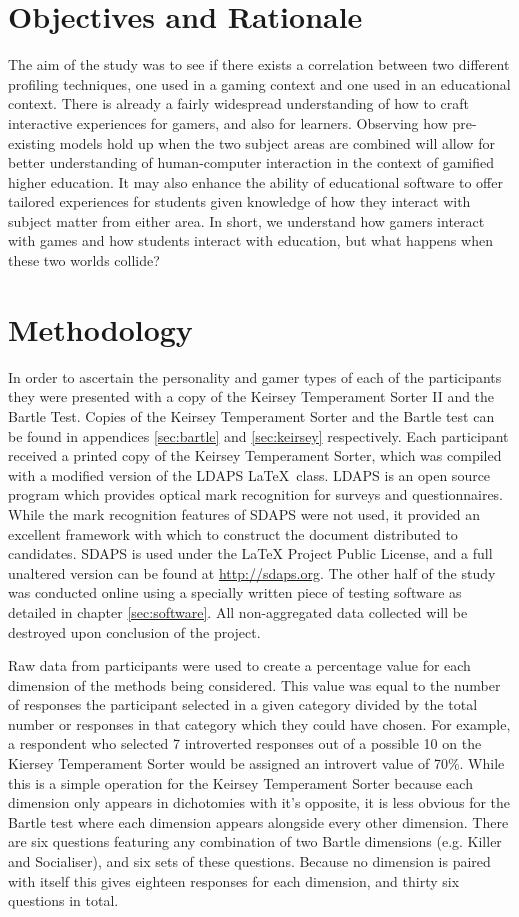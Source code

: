 \documentclass[12pt,a4paper,twoside]{report}
\begin{document}
\section{Objectives and Rationale}
The aim of the study was to see if there exists a correlation between two different profiling techniques, one used in a gaming context and one used in an educational context. There is already a fairly widespread understanding of how to craft interactive experiences for gamers, and also for learners. Observing how pre-existing models hold up when the two subject areas are combined will allow for better understanding of human-computer interaction in the context of gamified higher education. It may also enhance the ability of educational software to offer tailored experiences for students given knowledge of how they interact with subject matter from either area. In short, we understand how gamers interact with games and how students interact with education, but what happens when these two worlds collide?

\section{Methodology}
\label{method}
In order to ascertain the personality and gamer types of each of the participants they were presented with a copy of the Keirsey Temperament Sorter II and the Bartle Test. Copies of the Keirsey Temperament Sorter and the Bartle test can be found in appendices \ref{sec:bartle} and \ref{sec:keirsey} respectively. Each participant received a printed copy of the Keirsey Temperament Sorter, which was compiled with a modified version of the LDAPS  \LaTeX \ class. LDAPS is an open source program which provides optical mark recognition for surveys and questionnaires. While the mark recognition features of SDAPS were not used, it provided an excellent framework with which to construct the document distributed to candidates. SDAPS is used under the LaTeX Project Public License, and a full unaltered version can be found at \url{http://sdaps.org}. The other half of the study was conducted online using a specially written piece of testing software as detailed in chapter \ref{sec:software}. All non-aggregated data collected will be destroyed upon conclusion of the project.

Raw data from participants were used to create a percentage value for each dimension of the methods being considered. This value was equal to the number of responses the participant selected in a given category divided by the total number or responses in that category which they could have chosen. For example, a respondent who selected 7 introverted responses out of a possible 10 on the Kiersey Temperament Sorter would be assigned an introvert value of 70\%. While this is a simple operation for the Keirsey Temperament Sorter because each dimension only appears in dichotomies with it's opposite, it is less obvious for the Bartle test where each dimension appears alongside every other dimension. There are six questions featuring any combination of two Bartle dimensions (e.g. Killer and Socialiser), and six sets of these questions. Because no dimension is paired with itself this gives eighteen responses for each dimension, and thirty six questions in total.
\end{document}
